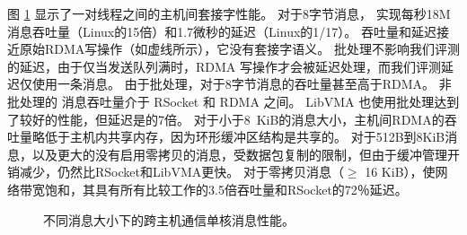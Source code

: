 图 \ref {socksdirect:fig:eval-msgsize-inter} 显示了一对线程之间的主机间套接字性能。
对于8字节消息，\sys{} 实现每秒18M消息吞吐量（Linux的15倍）和1.7微秒的延迟（Linux的1/17）。
吞吐量和延迟接近原始RDMA写操作（如虚线所示），它没有套接字语义。
批处理不影响我们评测的延迟，由于仅当发送队列满时，RDMA 写操作才会被延迟处理，而我们评测延迟仅使用一条消息。
由于批处理，\sys  {}对于8字节消息的吞吐量甚至高于RDMA。
非批处理的 \sys{} 消息吞吐量介于 RSocket 和 RDMA 之间。
LibVMA 也使用批处理达到了较好的性能，但延迟是\sys  {}的7倍。
对于小于8~KiB的消息大小，主机间RDMA的吞吐量略低于主机内共享内存，因为环形缓冲区结构是共享的。
对于512B到8KiB消息，以及更大的没有启用零拷贝的消息，\sys  {}受数据包复制的限制，但由于缓冲管理开销减少，仍然比RSocket和LibVMA更快。
对于零拷贝消息（$\ge$ 16 KiB），\sys  {}使网络带宽饱和，其具有所有比较工作的3.5倍吞吐量和RSocket的72％延迟。


\begin{figure}[htbp]
	\centering
	
	\caption{不同消息大小下的跨主机通信单核消息性能。}
	\label{socksdirect:fig:eval-msgsize-inter}
\end{figure}

